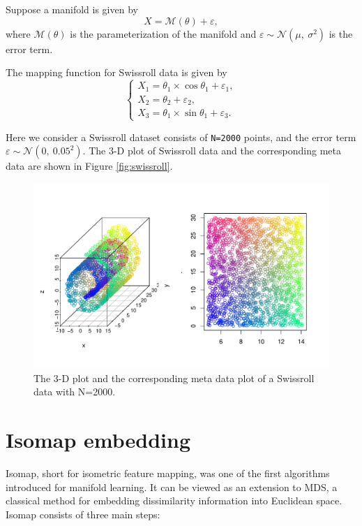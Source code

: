 \documentclass[11pt,a4paper,]{article}
\begin{document}
Suppose a manifold is given by
\[
X = \mathcal{M}(\theta) + \varepsilon,
\]
where \(\mathcal{M}(\theta)\) is the parameterization of the manifold and \(\varepsilon \sim \mathcal{N}(\mu, \ \sigma^{2})\) is the error term.

The mapping function for Swissroll data is given by
\[
\left\{ 
\begin{array}{lcl}
X_1 = \theta_1 \times \cos{\theta_1} + \varepsilon_1, \\
X_2 = \theta_2 + \varepsilon_2, \\
X_3 = \theta_1 \times \sin{\theta_1} + \varepsilon_3.
\end{array}
\right.
\]

Here we consider a Swissroll dataset consists of \texttt{N=2000} points, and the error term \(\varepsilon \sim \mathcal{N}(0, \ 0.05^{2})\). The 3-D plot of Swissroll data and the corresponding meta data are shown in Figure \ref{fig:swissroll}.

\begin{figure}

{\centering \includegraphics[width=1\linewidth]{Simulation_files/figure-latex/sr-1} 

}

\caption{The 3-D plot and the corresponding meta data plot of a Swissroll data with N=2000.}\label{fig:sr}
\end{figure}

\hypertarget{isomap-embedding}{%
\section{Isomap embedding}\label{isomap-embedding}}

Isomap, short for isometric feature mapping, was one of the first algorithms introduced for manifold learning.
It can be viewed as an extension to MDS, a classical method for embedding dissimilarity information into Euclidean space. Isomap consists of three main steps:
\end{document}
